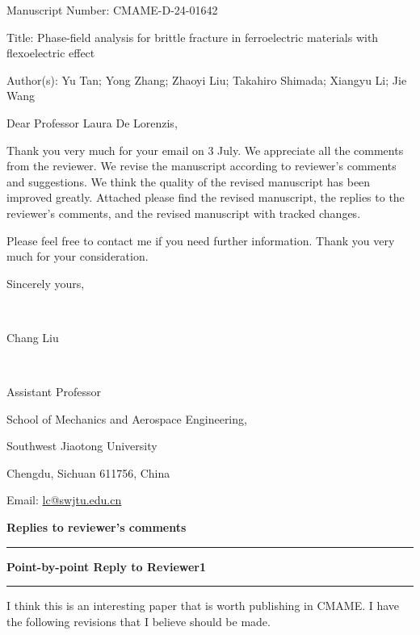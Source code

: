 \documentclass[12pt,fleqn]{article}
\begin{document}
\begin{flushleft}
Manuscript Number: CMAME-D-24-01642

Title: Phase-field analysis for brittle fracture in ferroelectric materials with flexoelectric effect

Author(s): Yu Tan; Yong Zhang; Zhaoyi Liu; Takahiro Shimada; Xiangyu Li; Jie Wang    
\end{flushleft}
\begin{flushleft}
Dear Professor Laura De Lorenzis,
\end{flushleft}

Thank you very much for your email on 3 July. We appreciate all the comments from the reviewer. We revise the manuscript according to reviewer’s comments and suggestions. We think the quality of the revised manuscript has been improved greatly. Attached please find the revised manuscript, the replies to the reviewer's comments, and the revised manuscript with tracked changes.

Please feel free to contact me if you need further information. Thank you very much for your consideration.

\begin{flushleft}
Sincerely yours,

~ 

Chang Liu

~

Assistant Professor

School of Mechanics and Aerospace Engineering, 

Southwest Jiaotong University

Chengdu, Sichuan 611756, China

Email: \href{mailto:lc@swjtu.edu.cn}{lc@swjtu.edu.cn}
\end{flushleft}

\newpage
\begin{flushleft}
    \textbf{Replies to reviewer’s comments}
    \vspace{1em} 
    \hrule
    \vspace{1em} 
    \textbf{Point-by-point Reply to Reviewer1}
    \vspace{1em} 
    \hrule
    \vspace{1em} 
\end{flushleft}
\begin{question}{}\label{R1:general}
I think this is an interesting paper that is worth publishing in CMAME. I have the following revisions that I believe should be made.
\end{question}
\end{document}
